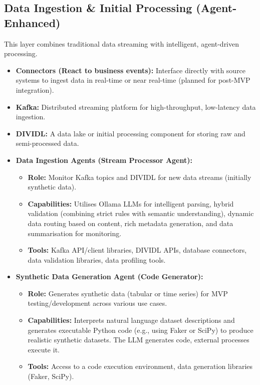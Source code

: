 \documentclass{article}
\begin{document}
\subsection{Data Ingestion \& Initial Processing (Agent-Enhanced)}
This layer combines traditional data streaming with intelligent, agent-driven processing.
\begin{itemize}
    \item \textbf{Connectors (React to business events):} Interface directly with source systems to ingest data in real-time or near real-time (planned for post-MVP integration).
    \item \textbf{Kafka:} Distributed streaming platform for high-throughput, low-latency data ingestion.
    \item \textbf{DIVIDL:} A data lake or initial processing component for storing raw and semi-processed data.
    \item \textbf{Data Ingestion Agents (Stream Processor Agent):}
        \begin{itemize}
            \item \textbf{Role:} Monitor Kafka topics and DIVIDL for new data streams (initially synthetic data).
            \item \textbf{Capabilities:} Utilises Ollama LLMs for intelligent parsing, hybrid validation (combining strict rules with semantic understanding), dynamic data routing based on content, rich metadata generation, and data summarisation for monitoring.
            \item \textbf{Tools:} Kafka API/client libraries, DIVIDL APIs, database connectors, data validation libraries, data profiling tools.
        \end{itemize}
    \item \textbf{Synthetic Data Generation Agent (Code Generator):}
        \begin{itemize}
            \item \textbf{Role:} Generates synthetic data (tabular or time series) for MVP testing/development across various use cases.
            \item \textbf{Capabilities:} Interprets natural language dataset descriptions and generates executable Python code (e.g., using Faker or SciPy) to produce realistic synthetic datasets. The LLM generates code, external processes execute it.
            \item \textbf{Tools:} Access to a code execution environment, data generation libraries (Faker, SciPy).
        \end{itemize}

\end{itemize}
\end{document}
